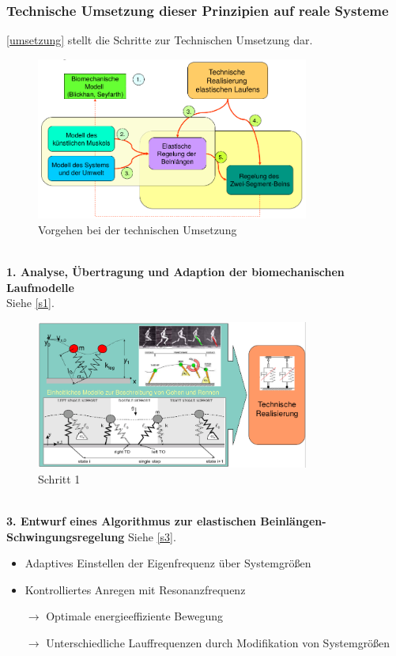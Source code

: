 \subsubsection{Technische Umsetzung dieser Prinzipien auf reale Systeme}
\autoref{umsetzung} stellt die Schritte zur Technischen Umsetzung dar.
\begin{figure}[h!]
	\centering
	\includegraphics[width=0.8\textwidth]{figures/ch06_umsetzung.png}
	\caption{Vorgehen bei der technischen Umsetzung}
	\label{umsetzung}
\end{figure}\\
\textbf{1. Analyse, Übertragung und Adaption der biomechanischen Laufmodelle}\\
Siehe \autoref{s1}.
\begin{figure}[h!]
	\centering
	\includegraphics[width=0.8\textwidth]{figures/ch06_tu1.png}
	\caption{Schritt 1}
	\label{s1}
\end{figure}\\
\textbf{3. Entwurf eines Algorithmus zur elastischen Beinlängen-Schwingungsregelung}
Siehe \autoref{s3}.
\begin{itemize}
\item Adaptives Einstellen der Eigenfrequenz über Systemgrößen
\item Kontrolliertes Anregen mit Resonanzfrequenz
\item[$\rightarrow$] Optimale energieeffiziente Bewegung
\item[$\rightarrow$] Unterschiedliche Lauffrequenzen durch Modifikation von Systemgrößen
\end{itemize}
